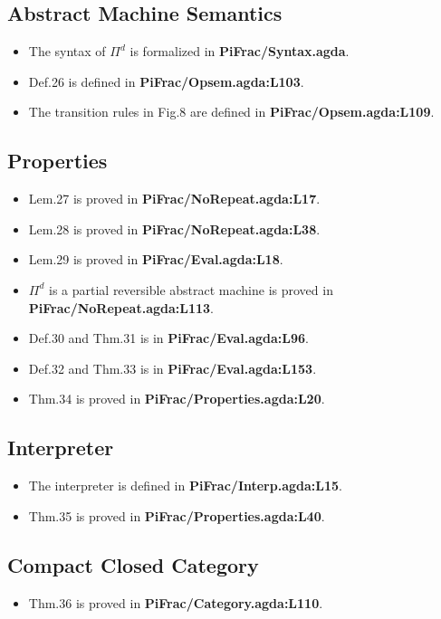 \documentclass{article}
\begin{document}
\subsection{Abstract Machine Semantics}
\begin{itemize}
\item The syntax of $\Pi^d$ is formalized in \textbf{PiFrac/Syntax.agda}.
\item Def.26 is defined in \textbf{PiFrac/Opsem.agda:L103}.
\item The transition rules in Fig.8 are defined in \textbf{PiFrac/Opsem.agda:L109}.
\end{itemize}

\subsection{Properties}
\begin{itemize}
\item Lem.27 is proved in \textbf{PiFrac/NoRepeat.agda:L17}.
\item Lem.28 is proved in \textbf{PiFrac/NoRepeat.agda:L38}.
\item Lem.29 is proved in \textbf{PiFrac/Eval.agda:L18}.
\item $\Pi^d$ is a partial reversible abstract machine is proved in \textbf{PiFrac/NoRepeat.agda:L113}.
\item Def.30 and Thm.31 is in \textbf{PiFrac/Eval.agda:L96}.
\item Def.32 and Thm.33 is in \textbf{PiFrac/Eval.agda:L153}.
\item Thm.34 is proved in \textbf{PiFrac/Properties.agda:L20}.
\end{itemize}

\subsection{Interpreter}
\begin{itemize}
\item The interpreter is defined in \textbf{PiFrac/Interp.agda:L15}.
\item Thm.35 is proved in \textbf{PiFrac/Properties.agda:L40}.
\end{itemize}

\subsection{Compact Closed Category}
\begin{itemize}
\item Thm.36 is proved in \textbf{PiFrac/Category.agda:L110}.
\end{itemize}
\end{document}
